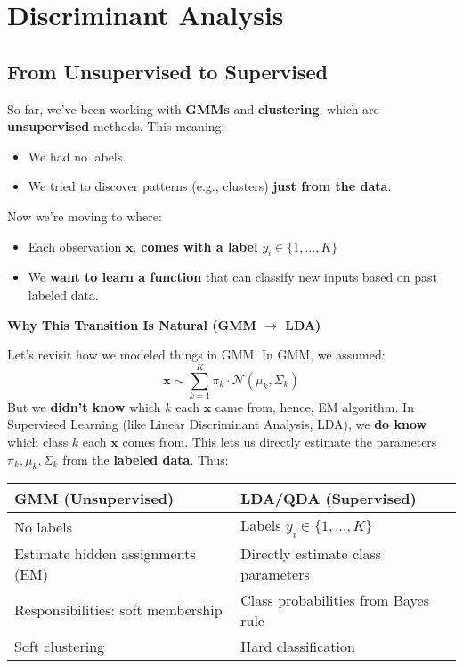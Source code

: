 \section{Discriminant Analysis}

\subsection{From Unsupervised to Supervised}

So far, we've been working with \textbf{GMMs} and \textbf{clustering}, which are \textbf{unsupervised} methods. This meaning:
\begin{itemize}
    \item We had no labels.
    \item We tried to discover patterns (e.g., clusters) \textbf{just from the data}.
\end{itemize}
Now we're moving to  where:
\begin{itemize}
    \item Each observation $\mathbf{x}_i$ \textbf{comes with a label} $y_i \in \{1, \dots, K\}$
    \item We \textbf{want to learn a function} that can classify new inputs based on past labeled data.
\end{itemize}

\highspace
\begin{flushleft}
    \textcolor{Green3}{ \textbf{Why This Transition Is Natural (GMM $\rightarrow$ LDA)}}
\end{flushleft}
Let's revisit how we modeled things in GMM. In GMM, we assumed:
\begin{equation*}
    \mathbf{x} \sim \sum_{k=1}^K \pi_k \cdot \mathcal{N}(\mu_k, \Sigma_k)
\end{equation*}
But we \textbf{didn't know} which $k$ each $\mathbf{x}$ came from, hence, EM algorithm. In Supervised Learning (like Linear Discriminant Analysis, LDA), we \textbf{do know} which class $k$ each $\mathbf{x}$ comes from. This lets us directly estimate the parameters $\pi_k, \mu_k, \Sigma_k$ from the \textbf{labeled data}. Thus:

\begin{table}[!htp]
    \centering
    \begin{tabular}{@{} l | l @{}}
        \toprule
        \textbf{GMM (Unsupervised)}         & \textbf{LDA/QDA (Supervised)}  \\
        \midrule
        No labels                           & Labels $y_i \in \{1, \dots, K\}$    \\ [.3em]
        Estimate hidden assignments (EM)    & Directly estimate class parameters  \\ [.3em]
        Responsibilities: soft membership   & Class probabilities from Bayes rule \\ [.3em]
        Soft clustering                     & Hard classification                 \\
        \bottomrule
    \end{tabular}
\end{table}

